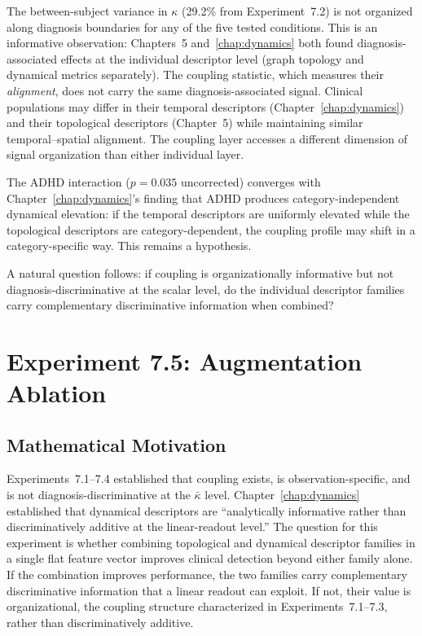The between-subject variance in $\kappa$ (29.2\% from Experiment~7.2) is not organized along diagnosis boundaries for any of the five tested conditions. This is an informative observation: Chapters~5 and~\ref{chap:dynamics} both found diagnosis-associated effects at the individual descriptor level (graph topology and dynamical metrics separately). The coupling statistic, which measures their \emph{alignment}, does not carry the same diagnosis-associated signal. Clinical populations may differ in their temporal descriptors (Chapter~\ref{chap:dynamics}) and their topological descriptors (Chapter~5) while maintaining similar temporal--spatial alignment. The coupling layer accesses a different dimension of signal organization than either individual layer.

The ADHD interaction ($p = 0.035$ uncorrected) converges with Chapter~\ref{chap:dynamics}'s finding that ADHD produces category-independent dynamical elevation: if the temporal descriptors are uniformly elevated while the topological descriptors are category-dependent, the coupling profile may shift in a category-specific way. This remains a hypothesis.

A natural question follows: if coupling is organizationally informative but not diagnosis-discriminative at the scalar level, do the individual descriptor families carry complementary discriminative information when combined?


\section{Experiment 7.5: Augmentation Ablation}
\label{sec:exp7_augmentation}

\subsection{Mathematical Motivation}

Experiments~7.1--7.4 established that coupling exists, is observation-specific, and is not diagnosis-discriminative at the $\bar{\kappa}$ level. Chapter~\ref{chap:dynamics} established that dynamical descriptors are ``analytically informative rather than discriminatively additive at the linear-readout level.'' The question for this experiment is whether combining topological and dynamical descriptor families in a single flat feature vector improves clinical detection beyond either family alone. If the combination improves performance, the two families carry complementary discriminative information that a linear readout can exploit. If not, their value is organizational, the coupling structure characterized in Experiments~7.1--7.3, rather than discriminatively additive.

